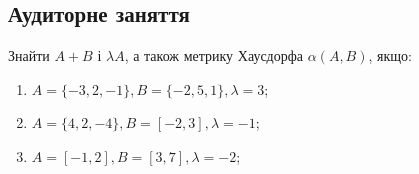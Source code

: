 \subsection{Аудиторне заняття}

\begin{problem}
	Знайти $A + B$ і $\lambda A$, а також метрику Хаусдорфа $\alpha (A, B)$, якщо:
	
	\begin{enumerate}
	    \item $A = \{-3, 2, -1\},  B = \{-2, 5, 1\},  \lambda = 3$;
	    
	    \item $A = \{4, 2, -4\},  B = [-2, 3],  \lambda = -1$;
	    
	    \item $A = [-1, 2],  B = [3, 7],  \lambda = -2$;	    
	\end{enumerate}
	
\end{problem}

